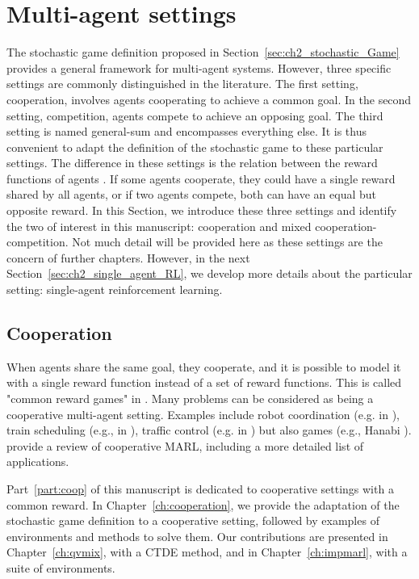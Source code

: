 \section{Multi-agent settings} 
\label{sec:ch2_multi_agent_settings}
The stochastic game definition proposed in Section~\ref{sec:ch2_stochastic_Game} provides a general framework for multi-agent systems.
However, three specific settings are commonly distinguished in the literature.
The first setting, cooperation, involves agents cooperating to achieve a common goal.
In the second setting, competition, agents compete to achieve an opposing goal.
The third setting is named general-sum and encompasses everything else.
It is thus convenient to adapt the definition of the stochastic game to these particular settings.
The difference in these settings is the relation between the reward functions of agents \citep{marl-book}.
If some agents cooperate, they could have a single reward shared by all agents, or if two agents compete, both can have an equal but opposite reward.
In this Section, we introduce these three settings and identify the two of interest in this manuscript: cooperation and mixed cooperation-competition.
Not much detail will be provided here as these settings are the concern of further chapters.
However, in the next Section~\ref{sec:ch2_single_agent_RL}, we develop more details about the particular setting: single-agent reinforcement learning.

\subsection{Cooperation} 
\label{sec:ch2_Cooperation}
When agents share the same goal, they cooperate, and it is possible to model it with a single reward function instead of a set of reward functions.
This is called "common reward games" in \citep{marl-book}.
Many problems can be considered as being a cooperative multi-agent setting.
Examples include robot coordination (e.g. in \citep{papoudakis2021benchmarking}), train scheduling (e.g., in \citep{mohanty2020flatland}), traffic control (e.g. in \citep{zhang2019cityflow}) but also games (e.g., Hanabi \citep{Bard_2020}).
\citet{oroojlooy2022review} provide a review of cooperative MARL, including a more detailed list of applications.

Part~\ref{part:coop} of this manuscript is dedicated to cooperative settings with a common reward.
In Chapter~\ref{ch:cooperation}, we provide the adaptation of the stochastic game definition to a cooperative setting, followed by examples of environments and methods to solve them.
Our contributions are presented in Chapter~\ref{ch:qvmix}, with a CTDE method, and in Chapter~\ref{ch:impmarl}, with a suite of environments.

